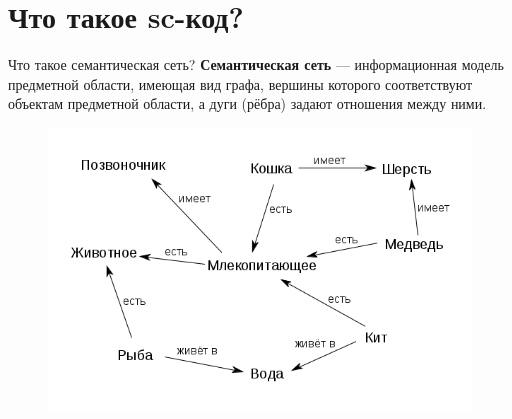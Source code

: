 % 
% 
%
% 
% 

\section{Что такое sc-код?}

\begin{frame}{Что такое семантическая сеть?}
  \textbf{Семантическая сеть} — информационная модель предметной
  области, имеющая вид графа, вершины которого соответствуют объектам
  предметной области, а дуги (рёбра) задают отношения между ними.
  \begin{figure}
    \centering
    \includegraphics[scale=0.5]{intro/Semantic_net_example}
  \end{figure}
\end{frame}


